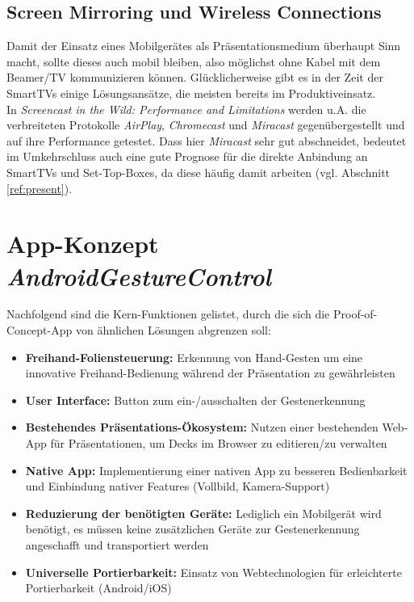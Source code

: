 \documentclass{article}
\begin{document}
\subsection{Screen Mirroring und Wireless Connections}
Damit der Einsatz eines Mobilgerätes als Präsentationsmedium überhaupt Sinn macht, sollte dieses auch mobil bleiben, also möglichst ohne Kabel mit dem Beamer/TV kommunizieren können. Glücklicherweise gibt es in der Zeit der SmartTVs einige Lösungsansätze, die meisten bereits im Produktiveinsatz.\\
In \textit{Screencast in the Wild: Performance and Limitations} \cite{Hsu14} werden u.A. die verbreiteten Protokolle \textit{AirPlay}, \textit{Chromecast} und \textit{Miracast} gegenübergestellt und auf ihre Performance getestet. Dass hier \textit{Miracast} sehr gut abschneidet, bedeutet im Umkehrschluss auch eine gute Prognose für die direkte Anbindung an SmartTVs und Set-Top-Boxes, da diese häufig damit arbeiten (vgl. Abschnitt \ref{ref:present}).


\section{App-Konzept \textit{AndroidGestureControl}}
Nachfolgend sind die Kern-Funktionen gelistet, durch die sich die Proof-of-Concept-App von ähnlichen Lösungen abgrenzen soll:
\begin{itemize}
\item \textbf{Freihand-Foliensteuerung:} Erkennung von Hand-Gesten um eine innovative Freihand-Bedienung während der Präsentation zu gewährleisten
\item \textbf{User Interface:} Button zum ein-/ausschalten der Gestenerkennung
\item \textbf{Bestehendes Präsentations-Ökosystem:} Nutzen einer bestehenden Web-App für Präsentationen, um Decks im Browser zu editieren/zu verwalten
\item \textbf{Native App:} Implementierung  einer nativen App zu besseren Bedienbarkeit und Einbindung nativer Features (Vollbild, Kamera-Support)
\item \textbf{Reduzierung der benötigten Geräte:} Lediglich ein Mobilgerät wird benötigt, es müssen keine zusätzlichen Geräte zur Gestenerkennung angeschafft und transportiert werden
\item \textbf{Universelle Portierbarkeit:} Einsatz von Webtechnologien für erleichterte Portierbarkeit (Android/iOS)
\end{itemize}
\end{document}
